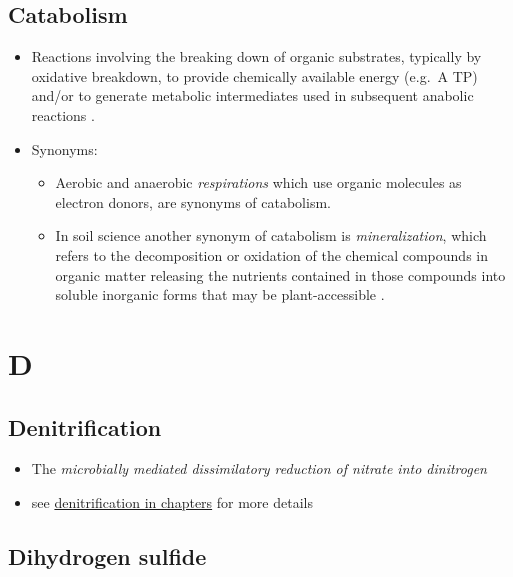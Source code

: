 \documentclass[]{book}
\providecommand{\tightlist}{%
  \setlength{\itemsep}{0pt}\setlength{\parskip}{0pt}}
\theoremstyle{definition}
\theoremstyle{definition}
\theoremstyle{definition}
\theoremstyle{remark}
\begin{document}
\hypertarget{catabolism}{\subsection{Catabolism}\label{catabolism}}

\begin{itemize}
\tightlist
\item
  Reactions involving the breaking down of organic substrates, typically
  by oxidative breakdown, to provide chemically available energy (e.g.~A
  TP) and/or to generate metabolic intermediates used in subsequent
  anabolic reactions \citep{De_Bolster1997-ul}.
\item
  Synonyms:

  \begin{itemize}
  \tightlist
  \item
    Aerobic and anaerobic \emph{respirations} which use organic
    molecules as electron donors, are synonyms of catabolism.
  \item
    In soil science another synonym of catabolism is
    \emph{mineralization}, which refers to the decomposition or
    oxidation of the chemical compounds in organic matter releasing the
    nutrients contained in those compounds into soluble inorganic forms
    that may be plant-accessible \citep{Wikipedia_contributors2018-ew}.
  \end{itemize}
\end{itemize}

\section{D}\label{d}

\hypertarget{denitrification}{\subsection{Denitrification}\label{denitrification}}

\begin{itemize}
\tightlist
\item
  The \emph{microbially mediated dissimilatory reduction of nitrate into
  dinitrogen}
\item
  see \protect\hyperlink{denit}{denitrification in chapters} for more
  details
\end{itemize}

\subsection{Dihydrogen sulfide}\label{dihydrogen-sulfide}
\end{document}
